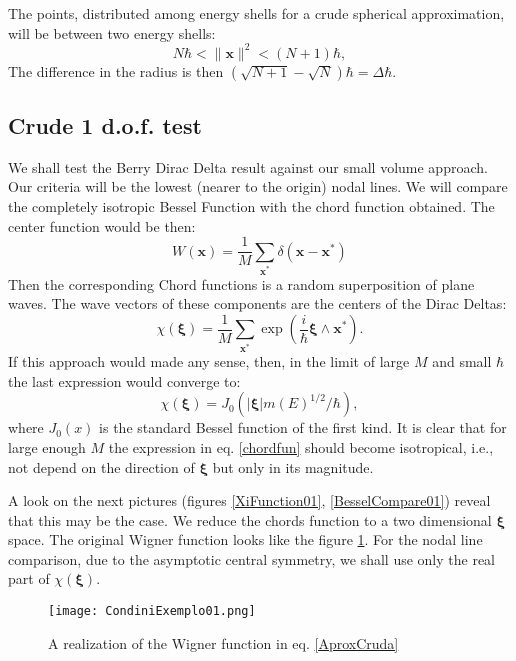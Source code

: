 \documentclass[a4paper,12pt]{article}
\newcommand{\ihb}{\frac{i}{\hbar}}
\newcommand{\xfase}{\mathbf{x}}
\newcommand{\xifase}{ {\boldsymbol{\xi}} }
\begin{document}
The points, distributed among energy shells for
a crude spherical approximation, will be between
two energy shells:
\begin{equation}
N\hbar< \|\xfase\|^2<(N+1)\hbar,
\end{equation}
The difference in the radius is then
$(\sqrt{N+1}-\sqrt{N})\hbar=\Delta\hbar$.


\subsection{Crude 1 d.o.f. test}

We shall test the Berry Dirac Delta result \cite{BerryRIR} 
against our 
small volume approach. Our criteria will be the lowest
(nearer to the origin) nodal lines. We will compare
the completely isotropic Bessel Function with the
chord function obtained. The center function would be then:
\begin{equation}\label{AproxCruda}
W(\xfase)=\frac{1}{M}\sum_{\xfase^*} \delta (\xfase - \xfase^*)
\end{equation}
Then the corresponding Chord functions is a random superposition
of plane waves. The wave vectors of these components are
the centers of the Dirac Deltas:
\begin{equation}\label{chordfun}
\chi(\xifase)=\frac{1}{M}\sum_{\xfase^*} \exp \left( \ihb \xifase\wedge\xfase^* \right).
\end{equation}
If this approach would made any sense,
then, in the limit of large $M$ and small $\hbar$
the last expression would converge to:
\begin{equation}\label{BerryApproach}
\chi(\xifase)=J_0(|\xifase|m(E)^{1/2}/\hbar),
\end{equation}
where $J_0(x)$ is the standard Bessel function of the first kind.  
It is clear that for large enough $M$ the expression 
in eq. \ref{chordfun} should become
isotropical, i.e., not depend on the direction of $\xifase$ but
only in its magnitude. 

A look on the next pictures (figures \ref{XiFunction01},
\ref{BesselCompare01})
reveal that this may be the case. 
We reduce  the chords function
to a two dimensional $\xifase$ space. The original 
Wigner function looks like the figure \ref{WigExample}.
For the nodal line comparison, due to
the asymptotic central symmetry, we shall use only the 
real part of $\chi(\xifase)$.


\begin{figure}
\begin{center}
  \texttt{[image: CondiniExemplo01.png]}
\caption{ A realization of the Wigner
function in eq. \ref{AproxCruda}}\label{WigExample}
\end{center}
\end{figure}
\end{document}
